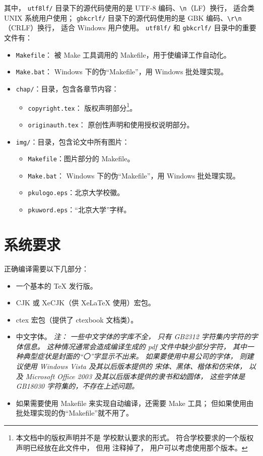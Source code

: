 	其中，%
	\verb|utf8lf/| 目录下的源代码使用的是 UTF-8 编码、\verb|\n|（LF）换行，
	适合类 UNIX 系统用户使用；%
	\verb|gbkcrlf/| 目录下的源代码使用的是 GBK 编码、\verb|\r\n|（CRLF）换行，
	适合 Windows 用户使用。%
	\verb|utf8lf/| 和 \verb|gbkcrlf/| 目录中的重要文件有：
	\begin{itemize}
		\item \verb|Makefile|：
			被 Make 工具调用的 Makefile，用于使编译工作自动化。
		\item \verb|Make.bat|：%
			Windows 下的伪“Makefile”，用 Windows 批处理实现。
		\item \verb|chap/|：目录，包含各章节内容：
		\begin{itemize}
			\item \verb|copyright.tex|：
				版权声明部分\footnote{%
					本文档中的版权声明并不是%
					学校默认要求的形式\cite{pku-copyright}。
					符合学校要求的一个版权声明已经放在此文件中，
					但用 \texttt{\string\iffalse{} ...\ \string\fi} %
					注释掉了，
					用户可以考虑使用那个版本。
				}。
			\item \verb|originauth.tex|：
				原创性声明和使用授权说明部分\cite{pku-originauth}。
		\end{itemize}
		\item \verb|img/|：目录，包含论文中所有图片：
		\begin{itemize}
			\item \verb|Makefile|：图片部分的 Makefile。
			\item \verb|Make.bat|：%
				Windows 下的伪“Makefile”，用 Windows 批处理实现。
			\item \verb|pkulogo.eps|：北京大学校徽。
			\item \verb|pkuword.eps|：“北京大学”字样。
		\end{itemize}
	\end{itemize}

	\section{系统要求}

	正确编译需要以下几部分：
	\begin{itemize}
		\item 一个基本的 \TeX{} 发行版。
		\item CJK 或 XeCJK（供 Xe\LaTeX{} 使用）宏包。
		\item ctex 宏包\cite{ctex,ctex-faq}（提供了 ctexbook 文档类）。
		\item 中文字体。\emph{%
			注：
			一些中文字体的字库不全，
			只有 GB2312 字符集内字符的字体信息。
			这种情况通常会造成编译生成的 pdf 文件中缺少部分字符，
			其中一种典型症状是封面的“〇”字显示不出来。
			如果要使用中易公司的字体，
			则建议使用 Windows Vista 及其以后版本提供的%
			宋体、黑体、楷体和仿宋体，
			以及 Microsoft Office 2003 及其以后版本提供的隶书和幼圆体，
			这些字体是 GB18030 字符集的，不存在上述问题。%
		}
		\item 如果需要使用 Makefile 来实现自动编译，还需要 Make 工具；
			但如果使用由批处理实现的伪“Makefile”就不用了。
	\end{itemize}

